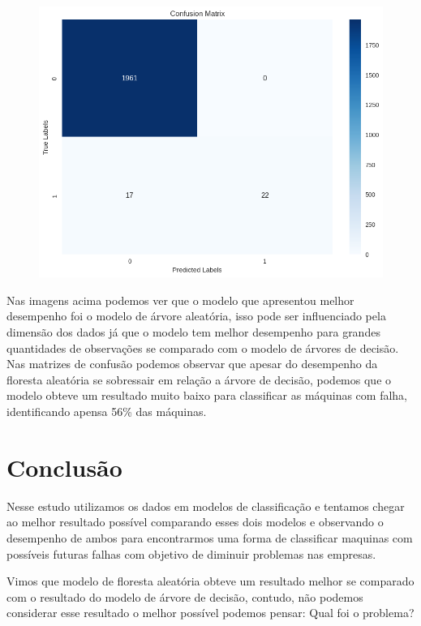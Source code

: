 \documentclass[
  oneclumn]{article}
\begin{document}
\begin{figure}
\begin{minipage}{0.50\linewidth}
\includegraphics{mc_rf.png}

\end{minipage}%

\end{figure}%

Nas imagens acima podemos ver que o modelo que apresentou melhor
desempenho foi o modelo de árvore aleatória, isso pode ser influenciado
pela dimensão dos dados já que o modelo tem melhor desempenho para
grandes quantidades de observações se comparado com o modelo de árvores
de decisão. Nas matrizes de confusão podemos observar que apesar do
desempenho da floresta aleatória se sobressair em relação a árvore de
decisão, podemos que o modelo obteve um resultado muito baixo para
classificar as máquinas com falha, identificando apensa 56\% das
máquinas.

\newpage

\section{Conclusão}\label{conclusuxe3o}

Nesse estudo utilizamos os dados em modelos de classificação e tentamos
chegar ao melhor resultado possível comparando esses dois modelos e
observando o desempenho de ambos para encontrarmos uma forma de
classificar maquinas com possíveis futuras falhas com objetivo de
diminuir problemas nas empresas.

Vimos que modelo de floresta aleatória obteve um resultado melhor se
comparado com o resultado do modelo de árvore de decisão, contudo, não
podemos considerar esse resultado o melhor possível podemos pensar: Qual
foi o problema?
\end{document}
